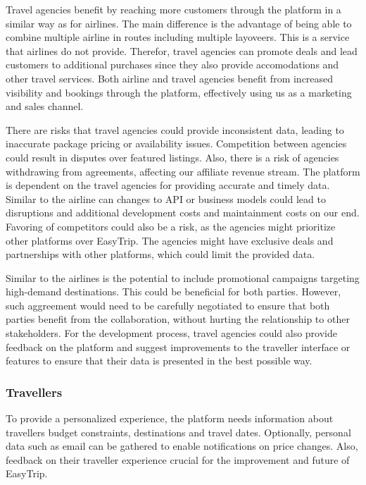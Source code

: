 Travel agencies benefit by reaching more customers through the platform in a similar way as for airlines. The main difference is the advantage of being able to combine multiple airline in routes including multiple layoveers. This is a service that airlines do not provide. Therefor, travel agencies can promote deals and lead customers to additional purchases since they also provide accomodations and other travel services. Both airline and travel agencies benefit from increased visibility and bookings through the platform, effectively using us as a marketing and sales channel.

There are risks that travel agencies could provide inconsistent data, leading to inaccurate package pricing or availability issues. Competition between agencies could result in disputes over featured listings. Also, there is a risk of agencies withdrawing from agreements, affecting our affiliate revenue stream. The platform is dependent on the travel agencies for providing accurate and timely data. Similar to the airline can changes to API or business models could lead to disruptions and additional development costs and maintainment costs on our end. Favoring of competitors could also be a risk, as the agencies might prioritize other platforms over EasyTrip. The agencies might have exclusive deals and partnerships with other platforms, which could limit the provided data.

Similar to the airlines is the potential to include promotional campaigns targeting high-demand destinations. This could be beneficial for both parties. However, such aggreement would need to be carefully negotiated to ensure that both parties benefit from the collaboration, without hurting the relationship to other stakeholders. For the development process, travel agencies could also provide feedback on the platform and suggest improvements to the traveller interface or features to ensure that their data is presented in the best possible way.

\subsubsection{Travellers}
To provide a personalized experience, the platform needs information about travellers budget constraints, destinations and travel dates. Optionally, personal data such as email can be gathered to enable notifications on price changes. Also, feedback on their traveller experience crucial for the improvement and future of EasyTrip.

